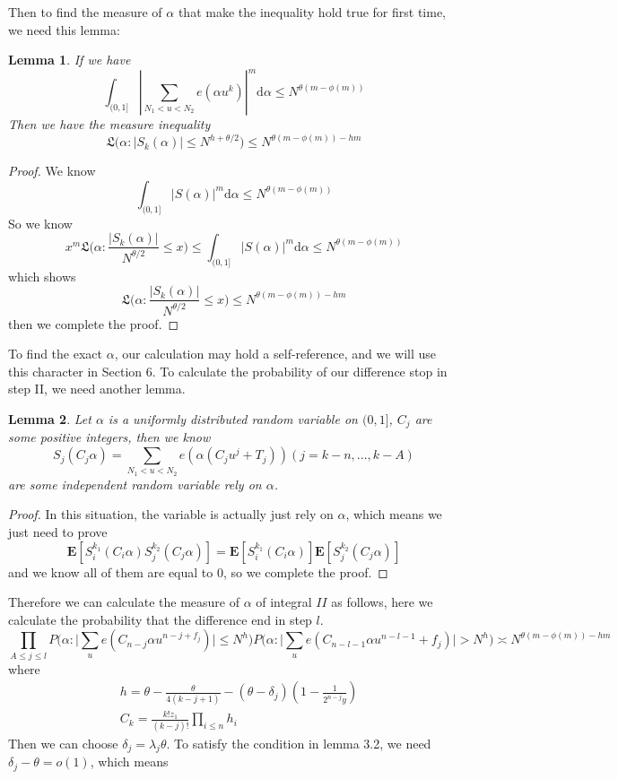 \documentclass[10pt]{article}
\newtheorem{lemma}{Lemma}[section]
\begin{document}
Then to find the measure of $\alpha$ that make the inequality hold true for first time, we need this lemma:
\begin{lemma}
If we have
\[
\int_{(0,1]}|\sum\limits_{N_1<u<N_2}e(\alpha u^k)|^m\mathrm{d}\alpha\leq N^{\theta(m-\phi(m))}
\]
Then we have the measure inequality
\[
\mathfrak{L}\Big(\alpha:|S_k(\alpha)|\leq N^{h+\theta/2}\Big)\leq N^{\theta(m-\phi(m))-hm}
\]
\end{lemma}
\begin{proof}
We know
\[
\int_{(0,1]}|S(\alpha)|^m\mathrm{d}\alpha\leq N^{\theta(m-\phi(m))}
\]
So we know
\[
x^m\mathfrak{L}\Big(\alpha:\frac{|S_k(\alpha)|}{N^{\theta/2}}\leq x\Big)\leq\int_{(0,1]}|S(\alpha)|^m\mathrm{d}\alpha\leq N^{\theta(m-\phi(m))}
\]
which shows
\[
\mathfrak{L}\Big(\alpha:\frac{|S_k(\alpha)|}{N^{\theta/2}}\leq x\Big)\leq N^{\theta(m-\phi(m))-hm}
\]
then we complete the proof.
\end{proof}
To find the exact $\alpha$, our calculation may hold a self-reference, and we will use this character in Section 6. To calculate the probability of our difference stop in step II, we need another lemma.
\begin{lemma}
Let $\alpha$ is a uniformly distributed random variable on $(0,1]$, $C_j$ are some positive integers, then we know
\[
S_j(C_j\alpha)=\sum\limits_{N_1<u<N_2}e(\alpha(C_ju^j+T_j))(j=k-n,...,k-A)
\]
are some independent random variable rely on $\alpha$.
\end{lemma}
\begin{proof}
In this situation, the variable is actually just rely on $\alpha$, which means we just need to prove
\[
\textbf{E}[S_i^{k_1}(C_i\alpha)S_j^{k_2}(C_j\alpha)]=\textbf{E}[S_i^{k_1}(C_i\alpha)]\textbf{E}[S_j^{k_2}(C_j\alpha)]
\]
and we know all of them are equal to $0$, so we complete the proof.
\end{proof}
Therefore we can calculate the measure of $\alpha$ of integral $II$ as follows, here we calculate the probability that the difference end in step $l$.
\[
\prod\limits_{A\leq j\leq l}P\Big(\alpha:\Big|\sum\limits_{u}e(C_{n-j}\alpha u^{n-j+f_j})\Big|\leq N^{h}\Big)P\Big(\alpha:\Big|\sum\limits_{u}e(C_{n-l-1}\alpha u^{n-{l}-1}+f_j)\Big|>N^{h}\Big)
\asymp N^{\theta(m-\phi(m))-hm}
\]
where
\begin{align*}
&h=\theta-\frac{\theta}{4(k-j+1)}-(\theta-\delta_j)(1-\frac{1}{2^{n-j}y})\\
&C_k=\frac{k!z_1}{(k-j)!}\prod\limits_{i\leq n}h_i
\end{align*}
Then we can choose $\delta_j=\lambda_j\theta$. To satisfy the condition in lemma 3.2, we need $\delta_j-\theta=o(1)$, which means
\end{document}
